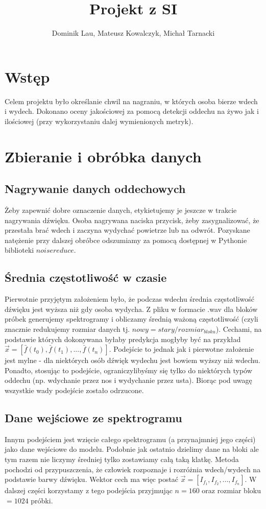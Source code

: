 \documentclass{article}
\title{Projekt z SI}
\author{Dominik Lau, Mateusz Kowalczyk, Michał Tarnacki}
\begin{document}
\maketitle

\section{Wstęp}
Celem projektu było określanie chwil na nagraniu, w których osoba bierze wdech i wydech. 
Dokonano oceny jakościowej za pomocą detekcji oddechu na żywo jak i ilościowej (przy wykorzystaniu
dalej wymienionych metryk).
\section{Zbieranie i obróbka danych}
\subsection{Nagrywanie danych oddechowych}
Żeby zapewnić dobre oznaczenie danych, etykietujemy je jeszcze w trakcie nagrywania dźwięku. 
Osoba nagrywana naciska przycisk, żeby zasygnalizować, że przestała brać wdech i zaczyna wydychać 
powietrze lub na odwrót. Pozyskane natężenie przy dalszej obróbce odszumiamy za pomocą dostępnej
w Pythonie biblioteki $noisereduce$.

\subsection{Średnia częstotliwość w czasie}
Pierwotnie przyjętym założeniem było, że podczas wdechu średnia częstotliwość dźwięku jest wyższa niż
gdy osoba wydycha. Z pliku w formacie .wav dla bloków próbek generujemy spektrogramy i obliczamy
średnią ważoną częstotliwość (czyli znacznie redukujemy rozmiar danych tj. $nowy = stary/rozmiar_{bloku}$).
Cechami, na podstawie których
dokonywana byłaby predykcja mogłyby być na przykład $\vec{x} = [\bar{f}(t_0), \bar{f}(t_1), ..., \bar{f}(t_n)]$.
Podejście to jednak jak i pierwotne założenie jest mylne - dla niektórych osób 
dźwięk wydechu jest bowiem wyższy
niż wdechu. Ponadto, stosując to podejście, ograniczylibyśmy się tylko do niektórych typów oddechu (np. 
wdychanie przez nos i wydychanie przez usta).  Biorąc pod uwagę wszystkie wady podejście zostało odrzucone.
\subsection{Dane wejściowe ze spektrogramu}
Innym podejściem jest wzięcie całego spektrogramu (a przynajmniej jego części) jako dane wejściowe do 
modelu.  Podobnie jak ostatnio dzielimy dane na bloki ale tym razem nie liczymy średniej tylko zostawiamy
całą taką klatkę.
Metoda pochodzi od przypuszczenia, że człowiek rozpoznaje i rozróżnia wdech/wydech
na podstawie barwy dźwięku.  Wektor cech ma więc postać $\vec{x} = [I_{f_1}, I_{f_2}, ..., I_{f_n}]$.
W dalszej części korzystamy z tego podejścia przyjmując $n=160$ oraz rozmiar bloku $=1024$ próbki.
\end{document}
